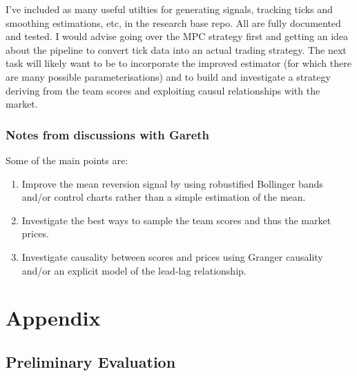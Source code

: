 \documentclass[a4paper]{scrreprt}
\begin{document}
I've included as many useful utilties for generating signals, tracking ticks
and smoothing estimations, etc, in the research base repo. All are fully
documented and tested. I would advise going over the MPC strategy first and
getting an idea about the pipeline to convert tick data into an actual trading
strategy. The next task will likely want to be to incorporate the improved
estimator (for which there are many possible parameterisations) and to build
and investigate a strategy deriving from the team scores and exploiting causul
relationships with the market.

\subsection{Notes from discussions with Gareth}
Some of the main points are:
\begin{enumerate}
    \item Improve the mean reversion signal by using robustified Bollinger
        bands and/or control charts rather than a simple estimation of the
        mean.
    \item Investigate the best ways to sample the team scores and thus the
        market prices.
    \item Investigate causality between scores and prices using Granger
        causality and/or an explicit model of the lead-lag relationship.
\end{enumerate}




\appendix
\chapter{Appendix}
\section{Preliminary Evaluation}

\end{document}
